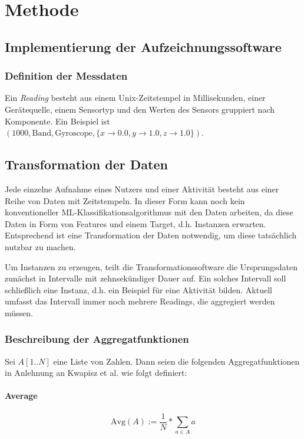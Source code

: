 \chapter{Methode}
\label{chap:method}

\section{Implementierung der Aufzeichnungssoftware}
\subsection{Definition der Messdaten}
\begin{definition}
Ein \textit{Reading} besteht aus einem Unix-Zeitstempel in Millisekunden, einer Gerätequelle, einem Sensortyp und den Werten des Sensors gruppiert nach Komponente. Ein Beispiel ist $(1000, \text{Band}, \text{Gyroscope}, \{x \to 0.0, y \to 1.0, z \to 1.0\})$.
\end{definition}

\section{Transformation der Daten}
Jede einzelne Aufnahme eines Nutzers und einer Aktivität besteht aus einer Reihe von Daten mit Zeitstempeln. In dieser Form kann noch kein konventioneller ML-Klassifikationsalgorithmus mit den Daten arbeiten, da diese Daten in Form von Features und einem Target, d.h. Instanzen erwarten. Entsprechend ist eine Transformation der Daten notwendig, um diese tatsächlich nutzbar zu machen.

Um Instanzen zu erzeugen, teilt die Transformationssoftware die Ursprungsdaten zunächst in Intervalle mit zehnsekündiger Dauer auf. Ein solches Intervall soll schließlich eine Instanz, d.h. ein Beispiel für eine Aktivität bilden. Aktuell umfasst das Intervall immer noch mehrere Readings, die aggregiert werden müssen.

\subsection{Beschreibung der Aggregatfunktionen}
Sei $A[1..N]$ eine Liste von Zahlen. Dann seien die folgenden Aggregatfunktionen in Anlehnung an Kwapisz et al.\cite{Kwapisz2011} wie folgt definiert:
\subsubsection{Average}
\[
\text{Avg}(A) := \frac{1}{N} * \sum_{a \in A} a
\]
